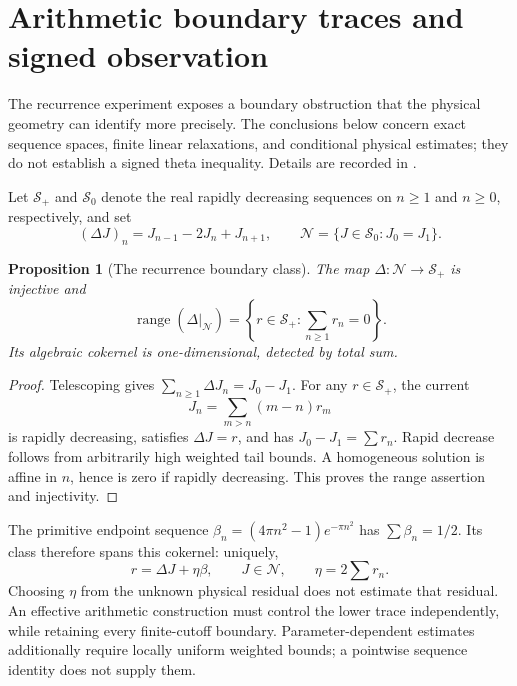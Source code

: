 \documentclass[11pt]{article}
\numberwithin{equation}{section}
\newtheorem{proposition}[theorem]{Proposition}
\theoremstyle{definition}
\theoremstyle{remark}
\begin{document}
\section{Arithmetic boundary traces and signed observation}
\label{obs:boundary-geometry}

The recurrence experiment exposes a boundary obstruction that the
physical geometry can identify more precisely.
The conclusions below concern exact sequence spaces, finite linear
relaxations, and conditional physical estimates; they do not establish
a signed theta inequality. Details are recorded in
\cite{ThetaBoundaryGeometry,ThetaSignedQuotient,ThetaScalarGeometry,
ThetaJointCurrent}.

Let $\mathcal S_+$ and $\mathcal S_0$ denote the real rapidly
decreasing sequences on $n\ge1$ and $n\ge0$, respectively, and set
\[
 (\Delta J)_n=J_{n-1}-2J_n+J_{n+1},\qquad
 \mathcal N=\{J\in\mathcal S_0:J_0=J_1\}.
\]
\begin{proposition}[The recurrence boundary class]
\label{obs:trace-cokernel}
The map $\Delta:\mathcal N\to\mathcal S_+$ is injective and
\begin{equation}
 \operatorname{range}(\Delta|_{\mathcal N})
 =\left\{r\in\mathcal S_+:\sum_{n\ge1}r_n=0\right\}.
 \label{obs:trace-range}
\end{equation}
Its algebraic cokernel is one-dimensional, detected by total sum.
\end{proposition}
\begin{proof}
Telescoping gives $\sum_{n\ge1}\Delta J_n=J_0-J_1$.
For any $r\in\mathcal S_+$, the current
\begin{equation}
 J_n=\sum_{m>n}(m-n)r_m
 \label{obs:tail-current}
\end{equation}
is rapidly decreasing, satisfies $\Delta J=r$, and has
$J_0-J_1=\sum r_n$.
Rapid decrease follows from arbitrarily high weighted tail bounds.
A homogeneous solution is affine in $n$, hence is zero if rapidly
decreasing.  This proves the range assertion and injectivity.
\end{proof}

The primitive endpoint sequence
$\beta_n=(4\pi n^2-1)e^{-\pi n^2}$ has $\sum\beta_n=1/2$.
Its class therefore spans this cokernel: uniquely,
\[
 r=\Delta J+\eta\beta,\qquad J\in\mathcal N,
 \qquad \eta=2\sum r_n.
\]
Choosing $\eta$ from the unknown physical residual does not estimate
that residual.  An effective arithmetic construction must control
the lower trace independently, while retaining every finite-cutoff
boundary.  Parameter-dependent estimates additionally require locally
uniform weighted bounds; a pointwise sequence identity does not
supply them.
\end{document}
